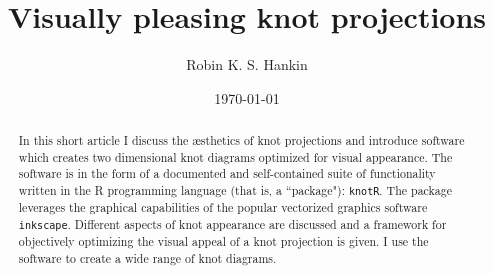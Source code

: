 \documentclass{birkjour}
\theoremstyle{definition}
\theoremstyle{remark}
\numberwithin{equation}{section}
\begin{document}
%
%
%
%
%
%
%
%
%


\title[Visually pleasing knot projections]{Visually pleasing knot projections}




\author[Hankin]{Robin K. S. Hankin}

\address{%
55 Wellesley Street East, Auckland 1010, New Zealand}




\date{\today}

\begin{abstract}
In this short article I discuss the \ae sthetics of knot projections
and introduce software which creates two dimensional knot diagrams
optimized for visual appearance.  The software is in the form of a
documented and self-contained suite of functionality written in the R
programming language (that is, a ``package"): {\tt knotR}.  The
package leverages the graphical capabilities of the popular vectorized
graphics software {\tt inkscape}.  Different aspects of knot
appearance are discussed and a framework for objectively optimizing
the visual appeal of a knot projection is given.  I use the software
to create a wide range of knot diagrams.
\end{abstract}

\maketitle
\end{document}
